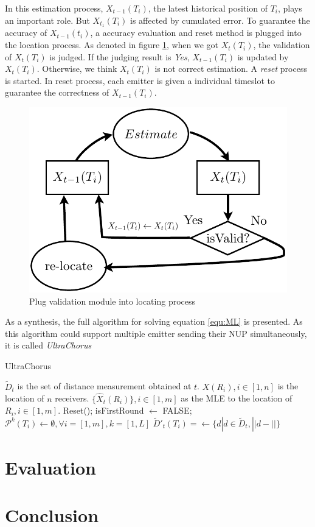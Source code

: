 \documentclass[conference]{IEEEtran}
\begin{document}
In this estimation process, $X_{t-1}(T_i)$, the latest historical position of $T_i$,
plays an important role. But $X_{t_1}(T_i)$ is affected by cumulated error.  To
guarantee the accuracy of $X_{t-1}(t_i)$, a accuracy evaluation and reset method is
plugged into the location process. As denoted in figure \ref{fig:DataFlow}, when we got
$X_t(T_i)$, the validation of $X_t(T_i)$ is judged. If the judging result is \emph{Yes},
$X_{t-1}(T_i)$ is updated by $X_t(T_i)$. Otherwise, we think $X_t(T_i)$ is not correct
estimation. A \emph{reset} process is started. In reset process, each emitter is given a
individual timeslot to guarantee the correctness of $X_{t-1}(T_i)$.
\begin{figure}[htpb]
    \begin{center}
	\includegraphics[width=.25\textwidth]{DataFlow}
    \end{center}
    \caption{Plug validation module into locating process}
    \label{fig:DataFlow}
\end{figure}

As a synthesis, the full algorithm for solving equation \ref{equ:ML} is presented. As
this algorithm could support multiple emitter sending their NUP simultaneously, it is
called \emph{UltraChorus}  
\begin{algorithm}[h]
    \caption{UltraChorus}
    \begin{algorithmic}[1]
	\REQUIRE $\tilde{D}_t$ is the set of distance measurement obtained at $t$.
	$X(R_i),i\in[1,n]$ is the location of $n$ receivers. 
	\ENSURE $\{\hat{X}_t(R_i)\},i\in[1,m]$ as the MLE to the location of $R_i,
	i\in[1,m]$.
	\STATE Reset();
	\STATE isFirstRound $\leftarrow$ FALSE;
	\STATE $\mathcal{P}^k(T_i)\leftarrow\emptyset,\forall i=[1,m],k=[1,L]$ 
	\ENDIF
	\STATE $\tilde{D}'_t(T_i)=\leftarrow \{d|d\in\tilde{D}_t,||d-|| \}$
	\ENDFOR
    \end{algorithmic}
    \label{algo:LB}
\end{algorithm}
\section{Evaluation}
\section{Conclusion}
%


\end{document}
